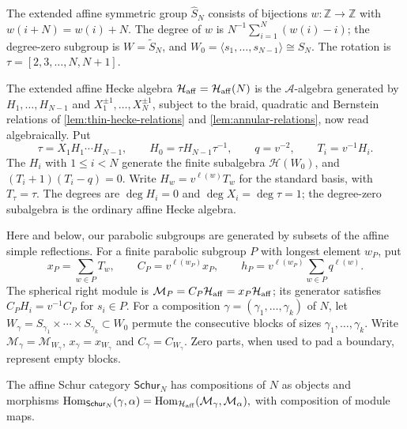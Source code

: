 \documentclass[a4paper,11pt]{amsart}
\numberwithin{equation}{subsection}
\theoremstyle{plain}
\theoremstyle{definition}
\theoremstyle{remark}
\newcommand{\Hom}{\operatorname{Hom}}
\begin{document}
\begin{definition}\label{def:affine-hecke-conventions}
The extended affine symmetric group $\widehat S_N$ consists
of bijections $w:\mathbb Z\to\mathbb Z$ with
$w(i+N)=w(i)+N$. The degree of $w$ is
$N^{-1}\sum_{i=1}^N(w(i)-i)$; the degree-zero subgroup is
$W=\widetilde S_N$, and
$W_0=\langle s_1,\ldots,s_{N-1}\rangle\cong S_N$.
The rotation is $\tau=[2,3,\ldots,N,N+1]$.

The extended affine Hecke algebra $\mathcal H_{\rm aff}=\mathcal H_{\rm aff}(N)$ is
the $\mathcal A$-algebra generated by $H_1,\ldots,H_{N-1}$
and $X_1^{\pm1},\ldots,X_N^{\pm1}$, subject to the braid,
quadratic and Bernstein relations of
\autoref{lem:thin-hecke-relations} and
\autoref{lem:annular-relations}, now read algebraically. Put
\[
\tau=X_1H_1\cdots H_{N-1},\qquad
H_0=\tau H_{N-1}\tau^{-1},\qquad
q=v^{-2},\qquad T_i=v^{-1}H_i.
\]
The $H_i$ with $1\le i<N$ generate the finite subalgebra
$\mathcal H(W_0)$, and $(T_i+1)(T_i-q)=0$.
Write $H_w=v^{\ell(w)}T_w$ for the standard basis, with
$T_\tau=\tau$. The degrees are $\deg H_i=0$ and
$\deg X_i=\deg\tau=1$; the degree-zero subalgebra is
the ordinary affine Hecke algebra.
\end{definition}

\begin{definition}\label{def:spherical-modules}
Here and below, our parabolic subgroups are generated by subsets
of the affine simple reflections. For a finite parabolic subgroup $P$
with longest element $w_P$, put
\[
x_P=\sum_{w\in P}T_w,\qquad
C_P=v^{\ell(w_P)}x_P,\qquad
h_P=v^{\ell(w_P)}\sum_{w\in P}q^{\ell(w)}.
\]
The spherical right module is
$\mathcal M_P=C_P\mathcal H_{\rm aff}=x_P\mathcal H_{\rm aff}$;
its generator satisfies $C_PH_i=v^{-1}C_P$ for $s_i\in P$.
For a composition $\gamma=(\gamma_1,\ldots,\gamma_k)$ of $N$,
let $W_\gamma=S_{\gamma_1}\times\cdots\times S_{\gamma_k}\subset W_0$
permute the consecutive blocks of sizes $\gamma_1,\ldots,\gamma_k$.
Write $\mathcal M_\gamma=\mathcal M_{W_\gamma}$,
$x_\gamma=x_{W_\gamma}$ and $C_\gamma=C_{W_\gamma}$.
Zero parts, when used to pad a boundary, represent empty blocks.
\end{definition}

\begin{definition}\label{def:affine-schur-maps}
The affine Schur category $\mathsf{Schur}_N$ has compositions
of $N$ as objects and morphisms
$\Hom_{\mathsf{Schur}_N}(\gamma,\alpha) =\Hom_{\mathcal H_{\rm aff}}(\mathcal M_\gamma,\mathcal M_\alpha),$
with composition of module maps.
\end{definition}
\end{document}
